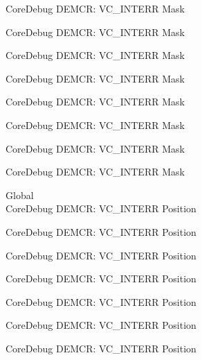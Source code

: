 \begin{DoxyRefList}
\label{deprecated__deprecated000509}%
%
Core\+Debug DEMCR\+: VC\+\_\+\+INTERR Mask 

\label{deprecated__deprecated000611}%
%
Core\+Debug DEMCR\+: VC\+\_\+\+INTERR Mask 

\label{deprecated__deprecated000736}%
%
Core\+Debug DEMCR\+: VC\+\_\+\+INTERR Mask 

\label{deprecated__deprecated000880}%
%
Core\+Debug DEMCR\+: VC\+\_\+\+INTERR Mask 

\label{deprecated__deprecated001022}%
%
Core\+Debug DEMCR\+: VC\+\_\+\+INTERR Mask 

\label{deprecated__deprecated001098}%
%
Core\+Debug DEMCR\+: VC\+\_\+\+INTERR Mask 

\label{deprecated__deprecated001187}%
%
Core\+Debug DEMCR\+: VC\+\_\+\+INTERR Mask 

\label{deprecated__deprecated001289}%
%
Core\+Debug DEMCR\+: VC\+\_\+\+INTERR Mask  
\item[Global \doxylink{group___c_m_s_i_s___core_debug_ga22079a6e436f23b90308be97e19cf07e}{Core\+Debug\+\_\+\+DEMCR\+\_\+\+VC\+\_\+\+INTERR\+\_\+\+Pos} ]\hfill \\
\label{deprecated__deprecated000057}%
%
Core\+Debug DEMCR\+: VC\+\_\+\+INTERR Position 

\label{deprecated__deprecated000201}%
%
Core\+Debug DEMCR\+: VC\+\_\+\+INTERR Position 

\label{deprecated__deprecated000343}%
%
Core\+Debug DEMCR\+: VC\+\_\+\+INTERR Position 

\label{deprecated__deprecated000419}%
%
Core\+Debug DEMCR\+: VC\+\_\+\+INTERR Position 

\label{deprecated__deprecated000508}%
%
Core\+Debug DEMCR\+: VC\+\_\+\+INTERR Position 

\label{deprecated__deprecated000610}%
%
Core\+Debug DEMCR\+: VC\+\_\+\+INTERR Position 

\label{deprecated__deprecated000735}%
%
Core\+Debug DEMCR\+: VC\+\_\+\+INTERR Position 


\end{DoxyRefList}
